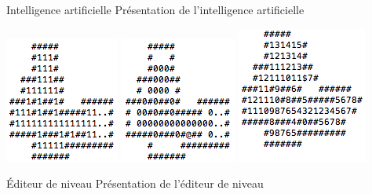 \documentclass{beamer}
\begin{document}
\begin{frame}{}
  \begin{block}{Intelligence artificielle}
    Présentation de l'intelligence artificielle
  \end{block}
  \begin{center}
    \includegraphics[width=.3\textwidth]{images/check.png}
    \includegraphics[width=.3\textwidth]{images/deadlock.png}
    \includegraphics[width=.3\textwidth]{images/radar.png}
  \end{center}
\end{frame}

\begin{frame}{}
  \begin{block}{Éditeur de niveau}
    Présentation de l'éditeur de niveau
  \end{block}
\end{frame}
\end{document}
